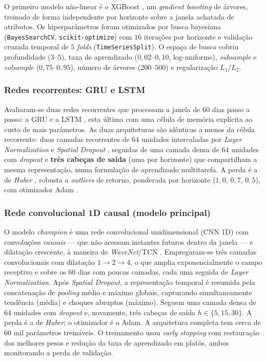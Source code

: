 \documentclass[12pt]{article}
\begin{document}
O primeiro modelo não-linear é o XGBoost \cite{chen2016xgboost}, um
\emph{gradient boosting} de árvores, treinado de forma independente por
horizonte sobre a janela achatada de atributos. Os hiperparâmetros foram
otimizados por busca bayesiana (\texttt{BayesSearchCV}, \texttt{scikit-optimize})
\cite{snoek2012bayesopt} com $16$ iterações por horizonte e validação cruzada
temporal de $5$ \emph{folds} (\texttt{TimeSeriesSplit}). O espaço de busca cobriu
profundidade ($3$--$5$), taxa de aprendizado ($0{,}02$--$0{,}10$, log-uniforme),
\emph{subsample} e \emph{colsample} ($0{,}75$--$0{,}95$), número de árvores
($200$--$500$) e regularização $L_1/L_2$.

\subsubsection{Redes recorrentes: GRU e LSTM}
\label{sec:rnn}

Avaliaram-se duas redes recorrentes que processam a janela de $60$ dias passo a
passo: a GRU \cite{cho2014gru} e a LSTM \cite{hochreiter1997lstm}, esta última
com uma célula de memória explícita ao custo de mais parâmetros. As duas
arquiteturas são idênticas a menos da célula recorrente: duas camadas
recorrentes de $64$ unidades intercaladas por \emph{Layer Normalization}
\cite{ba2016layernorm} e \emph{Spatial Dropout} \cite{tompson2015spatialdropout},
seguidas de uma camada densa de $64$ unidades com \emph{dropout}
\cite{srivastava2014dropout} e \textbf{três cabeças de saída} (uma por
horizonte) que compartilham a mesma representação, numa formulação de
aprendizado multitarefa. A perda é a de \emph{Huber} \cite{huber1964}, robusta a
\emph{outliers} de retorno, ponderada por horizonte ($1{,}0$, $0{,}7$, $0{,}5$),
com otimizador Adam \cite{kingma2015adam}.

\subsubsection{Rede convolucional 1D causal (modelo principal)}
\label{sec:cnn}

O modelo \emph{champion} é uma rede convolucional unidimensional (CNN 1D) com
convoluções \emph{causais} --- que não acessam instantes futuros dentro da
janela --- e dilatação crescente, à maneira de \emph{WaveNet}/TCN
\cite{oord2016wavenet,bai2018tcn}. Empregaram-se três camadas convolucionais
com dilatação $1 \to 2 \to 4$, o que amplia exponencialmente o campo receptivo
e cobre os $60$ dias com poucas camadas, cada uma seguida de \emph{Layer
Normalization}. Após \emph{Spatial Dropout}, a representação temporal é resumida
pela concatenação de \emph{pooling} médio e máximo globais, capturando
simultaneamente tendência (média) e choques abruptos (máximo). Seguem uma camada
densa de $64$ unidades com \emph{dropout} e, novamente, três cabeças de saída
$h \in \{5,15,30\}$. A perda é a de \emph{Huber}; o otimizador é o Adam. A
arquitetura completa tem cerca de $60$ mil parâmetros treináveis. O treinamento
usou \emph{early stopping} com restauração dos melhores pesos e redução da taxa
de aprendizado em platôs, ambos monitorando a perda de validação.
\end{document}

